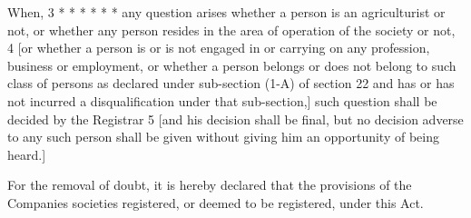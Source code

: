 \documentclass[reprint]{mhact}
\begin{document}




    When, 3 * * * * * * any question arises whether a person is an
    agriculturist or not, or whether any person resides in the area of
    operation of the society or not, 4 [or whether a person is or is
    not engaged in or carrying on any profession, business or
    employment, or whether a person belongs or does not belong to such
    class of persons as declared under sub-section (1-A) of section 22
    and has or has not incurred a disqualification under that
    sub-section,] such question shall be decided by the Registrar 5
    [and his decision shall be final, but no decision adverse to any
    such person shall be given without giving him an opportunity of
    being heard.]





     For the removal of
    doubt, it is hereby declared that the provisions of the Companies
    societies registered, or deemed to be registered, under this Act.

    
\end{document}
